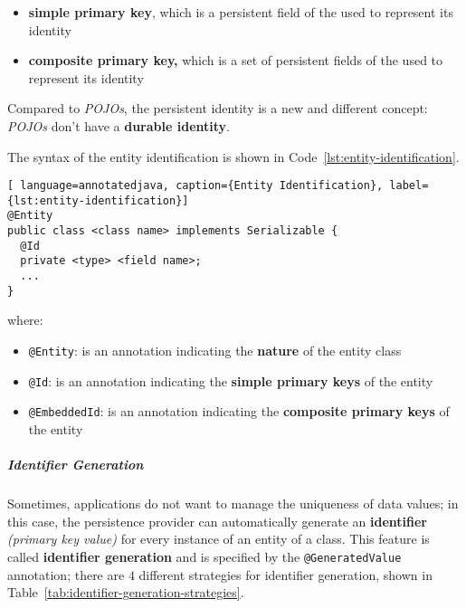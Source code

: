 \documentclass[english]{article}
\begin{document}
\begin{itemize}
  \item \textbf{simple primary key}, which is a persistent field of the \javab used to represent its identity
  \item \textbf{composite primary key,} which is a set of persistent fields of the \javab used to represent its identity
\end{itemize}

Compared to \textit{POJOs}, the persistent identity is a new and different concept: \textit{POJOs} don't have a \textbf{durable identity}.

The syntax of the entity identification is shown in Code~\ref{lst:entity-identification}.

\begin{lstlisting}[ language=annotatedjava, caption={Entity Identification}, label={lst:entity-identification}]
@Entity
public class <class name> implements Serializable {
  @Id
  private <type> <field name>;
  ...
}
\end{lstlisting}

where:
\begin{itemize}[label=\texttt{>}]
  \item \texttt{@Entity}: is an annotation indicating the \textbf{nature} of the entity class
  \item \texttt{@Id}: is an annotation indicating the \textbf{simple primary keys} of the entity
  \item \texttt{@EmbeddedId}: is an annotation indicating the \textbf{composite primary keys} of the entity
\end{itemize}

\subparagraph*{Identifier Generation}
Sometimes, applications do not want to manage the uniqueness of data values;
in this case, the persistence provider can automatically generate an \textbf{identifier} \textit{(primary key value)} for every instance of an entity of a class.
This feature is called \textbf{identifier generation} and is specified by the \texttt{@GeneratedValue} annotation;
there are \(4\) different strategies for identifier generation, shown in Table~\ref{tab:identifier-generation-strategies}.
\end{document}
